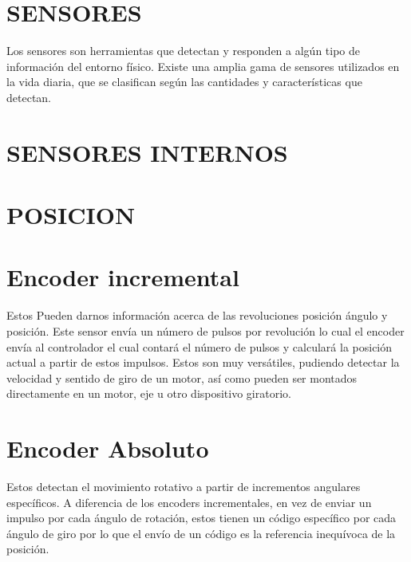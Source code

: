 \section{SENSORES}
Los sensores son herramientas que detectan y responden a algún tipo de información del entorno físico. Existe una amplia gama de sensores utilizados en la vida diaria, que se clasifican según las cantidades y características que detectan.
\section{SENSORES INTERNOS}
\section{POSICION}
\section*{Encoder incremental}
Estos Pueden darnos información acerca de las revoluciones posición ángulo y posición. Este sensor envía un número de pulsos por revolución lo cual el encoder envía al controlador el cual contará el número de pulsos y calculará la posición actual a partir de estos impulsos. Estos son muy versátiles, pudiendo detectar la velocidad y sentido de giro de un motor, así como pueden ser montados directamente en un motor, eje u otro dispositivo giratorio.
	\section{Encoder Absoluto}
Estos detectan el movimiento rotativo a partir de incrementos angulares específicos. A diferencia de los encoders incrementales, en vez de enviar un impulso por cada ángulo de rotación, estos tienen un código específico por cada ángulo de giro por lo que el envío de un código es la referencia inequívoca de la posición. 
